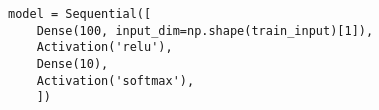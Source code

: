 \begin{verbatim}
model = Sequential([
    Dense(100, input_dim=np.shape(train_input)[1]),
    Activation('relu'),
    Dense(10),
    Activation('softmax'),
    ])
\end{verbatim}